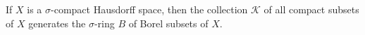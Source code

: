 If $X$ is a $\sigma$-compact Hausdorff space, then the collection $\mathcal{K}$ of all compact subsets of $X$ generates the $\sigma$-ring $B$ of Borel subsets of $X$.
